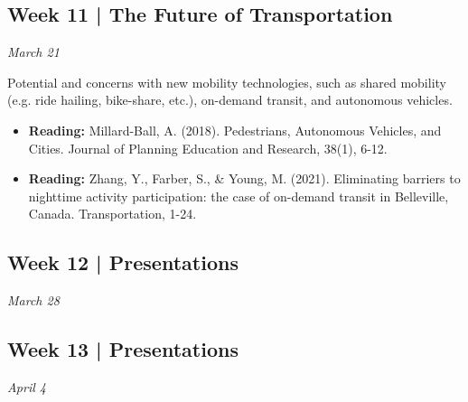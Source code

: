 \documentclass[11pt]{article}
\begin{document}
	
	
	
		
	\subsection*{Week 11 | The Future of Transportation}
	
	\textit{March 21}
	
	Potential and concerns with new mobility technologies, such as shared mobility (e.g. ride hailing, bike-share, etc.), on-demand transit, and autonomous vehicles.
	
	\begin{itemize}
		\item \textbf{Reading:} Millard-Ball, A. (2018). Pedestrians, Autonomous Vehicles, and Cities. Journal of
		Planning Education and Research, 38(1), 6-12.
		
		\item \textbf{Reading:} Zhang, Y., Farber, S., \& Young, M. (2021). Eliminating barriers to nighttime activity participation: the case of on-demand transit in Belleville, Canada. Transportation, 1-24.
	\end{itemize}
	
	
	
	
	
	\subsection*{Week 12 | Presentations}
	
	\textit{March 28}
	
	
	\subsection*{Week 13 | Presentations}

	\textit{April 4}

	



	
\end{document}
